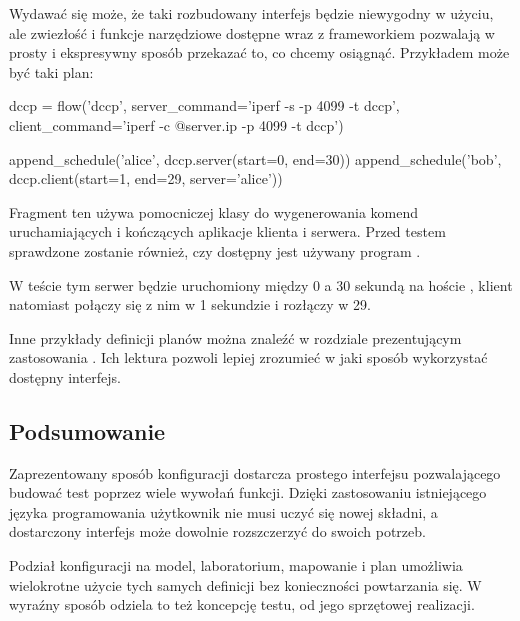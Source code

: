 \documentclass[00-praca-magisterska.tex]{subfiles}
\begin{document}
Wydawać się może, że taki rozbudowany interfejs będzie niewygodny w użyciu, ale
zwiezłość i funkcje narzędziowe dostępne wraz z frameworkiem pozwalają w prosty
i ekspresywny sposób przekazać to, co chcemy osiągnąć. Przykładem może być taki
plan:

\begin{pythoncode}
  dccp = flow('dccp',
      server_command='iperf -s -p 4099 -t dccp',
      client_command='iperf -c @{server.ip} -p 4099 -t dccp')

  append_schedule('alice', dccp.server(start=0, end=30))
  append_schedule('bob',   dccp.client(start=1, end=29, server='alice'))
\end{pythoncode}

Fragment ten używa pomocniczej klasy  do wygenerowania komend
uruchamiających i kończących aplikacje klienta i serwera. Przed testem
sprawdzone zostanie również, czy dostępny jest używany program .

W teście tym serwer będzie uruchomiony między 0 a 30 sekundą na
hoście , klient natomiast połączy się z nim w 1 sekundzie i rozłączy
w 29.

Inne przykłady definicji planów można znaleźć w rozdziale prezentującym
zastosowania . Ich lektura pozwoli lepiej zrozumieć
w jaki sposób wykorzystać dostępny interfejs.

\subsection{Podsumowanie}

Zaprezentowany sposób konfiguracji dostarcza prostego interfejsu pozwalającego
budować test poprzez wiele wywołań funkcji. Dzięki zastosowaniu istniejącego
języka programowania użytkownik nie musi uczyć się nowej składni, a dostarczony
interfejs może dowolnie rozszczerzyć do swoich potrzeb.

Podział konfiguracji na model, laboratorium, mapowanie i plan umożliwia
wielokrotne użycie tych samych definicji bez konieczności powtarzania się. W
wyraźny sposób odziela to też koncepcję testu, od jego sprzętowej realizacji.
\end{document}
